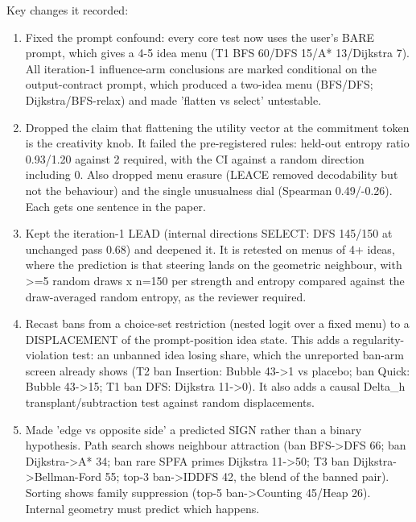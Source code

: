 \documentclass[11pt,letterpaper]{article}
\begin{document}
Key changes it recorded:

\begin{enumerate}\small

\item Fixed the prompt confound: every core test now uses the user's BARE prompt, which gives a 4-5 idea menu (T1 BFS 60/DFS 15/A* 13/Dijkstra 7). All iteration-1 influence-arm conclusions are marked conditional on the output-contract prompt, which produced a two-idea menu (BFS/DFS; Dijkstra/BFS-relax) and made 'flatten vs select' untestable.

\item Dropped the claim that flattening the utility vector at the commitment token is the creativity knob. It failed the pre-registered rules: held-out entropy ratio 0.93/1.20 against 2 required, with the CI against a random direction including 0. Also dropped menu erasure (LEACE removed decodability but not the behaviour) and the single unusualness dial (Spearman 0.49/-0.26). Each gets one sentence in the paper.

\item Kept the iteration-1 LEAD (internal directions SELECT: DFS 145/150 at unchanged pass 0.68) and deepened it. It is retested on menus of 4+ ideas, where the prediction is that steering lands on the geometric neighbour, with \textgreater{}=5 random draws x n=150 per strength and entropy compared against the draw-averaged random entropy, as the reviewer required.

\item Recast bans from a choice-set restriction (nested logit over a fixed menu) to a DISPLACEMENT of the prompt-position idea state. This adds a regularity-violation test: an unbanned idea losing share, which the unreported ban-arm screen already shows (T2 ban Insertion: Bubble 43-\textgreater{}1 vs placebo; ban Quick: Bubble 43-\textgreater{}15; T1 ban DFS: Dijkstra 11-\textgreater{}0). It also adds a causal Delta\_h transplant/subtraction test against random displacements.

\item Made 'edge vs opposite side' a predicted SIGN rather than a binary hypothesis. Path search shows neighbour attraction (ban BFS-\textgreater{}DFS 66; ban Dijkstra-\textgreater{}A* 34; ban rare SPFA primes Dijkstra 11-\textgreater{}50; T3 ban Dijkstra-\textgreater{}Bellman-Ford 55; top-3 ban-\textgreater{}IDDFS 42, the blend of the banned pair). Sorting shows family suppression (top-5 ban-\textgreater{}Counting 45/Heap 26). Internal geometry must predict which happens.


\end{enumerate}
\end{document}
